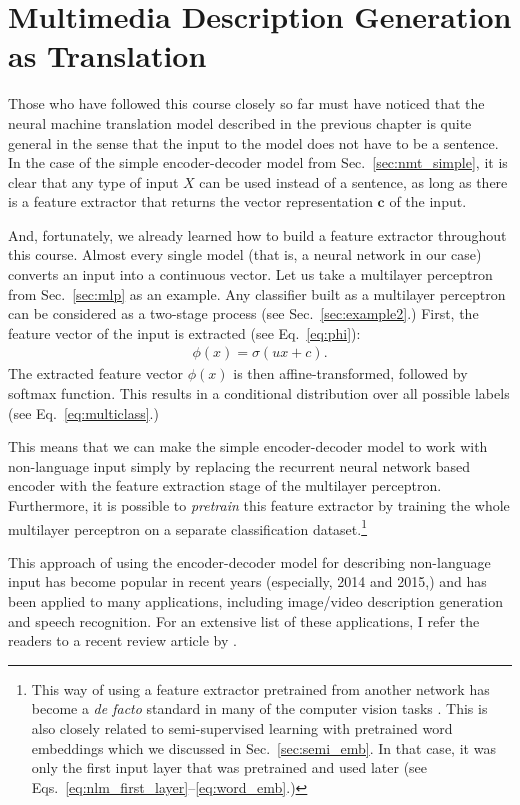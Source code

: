 \documentclass{report}
\newcommand{\vect}[1]{\mathbf{#1}}
\newcommand{\vc}[0]{\vect{c}}
\begin{document}
\section{Multimedia Description Generation as Translation}

Those who have followed this course closely so far must have noticed that the
neural machine translation model described in the previous chapter is quite
general in the sense that the input to the model does not have to be a sentence.
In the case of the simple encoder-decoder model from Sec.~\ref{sec:nmt_simple},
it is clear that any type of input $X$ can be used instead of a sentence, as
long as there is a feature extractor that returns the vector representation
$\vc$ of the input.

And, fortunately, we already learned how to build a feature extractor throughout
this course. Almost every single model (that is, a neural network in our case)
converts an input into a continuous vector. Let us take a multilayer perceptron
from Sec.~\ref{sec:mlp} as an example. Any classifier built as a multilayer
perceptron can be considered as a two-stage process (see
Sec.~\ref{sec:example2}.) First, the feature vector of the input is extracted
(see Eq.~\eqref{eq:phi}):
\begin{align*}
    \phi(x) = \sigma(u x + c).
\end{align*}
The extracted feature vector $\phi(x)$ is then affine-transformed, followed by
softmax function. This results in a conditional distribution over all possible
labels (see Eq.~\eqref{eq:multiclass}.)

This means that we can make the simple encoder-decoder model to work with
non-language input simply by replacing the recurrent neural network based
encoder with the feature extraction stage of the multilayer perceptron.
Furthermore, it is possible to {\em pretrain} this feature extractor by training
the whole multilayer perceptron on a separate classification dataset.\footnote{
    This way of using a feature extractor pretrained from another network has
    become a {\em de facto} standard in many of the computer vision tasks
    \citep{sermanet2013overfeat}. This
    is also closely related to semi-supervised learning with pretrained word
    embeddings which we discussed in Sec.~\ref{sec:semi_emb}. In that case, it
    was only the first input layer that was pretrained and used later (see
    Eqs.~\eqref{eq:nlm_first_layer}--\eqref{eq:word_emb}.)
}

This approach of using the encoder-decoder model for describing non-language
input has become popular in recent years (especially, 2014 and 2015,) and has
been applied to many applications, including image/video description generation
and speech recognition. For an extensive list of these applications, I refer the
readers to a recent review article by \citet{cho2015describing}.
\end{document}
